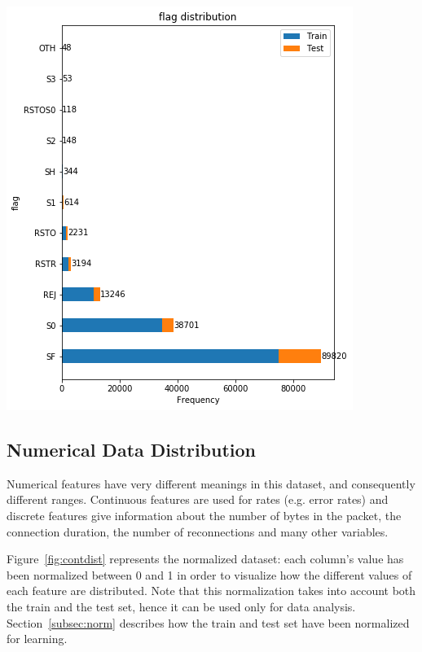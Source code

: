\includegraphics[width=0.9\linewidth]{img/cat9.png}

\FloatBarrier

\subsection{Numerical Data Distribution}

Numerical features have very different meanings in this dataset, and consequently different ranges. Continuous features are used for rates (e.g. error rates) and discrete features give information about the number of bytes in the packet, the connection duration, the number of reconnections and many other variables.

Figure~\ref{fig:contdist} represents the normalized dataset: each column's value has been normalized between 0 and 1 in order to visualize how the different values of each feature are distributed. Note that this normalization takes into account both the train and the test set, hence it can be used only for data analysis. Section~\ref{subsec:norm} describes how the train and test set have been normalized for learning. 

